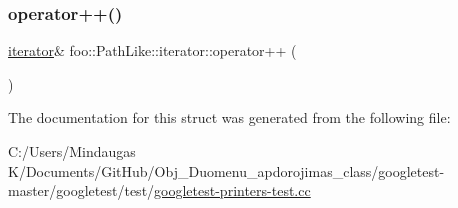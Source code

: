 \subsubsection{\texorpdfstring{operator++()}{operator++()}\hspace{0.1cm}{\footnotesize\ttfamily [2/2]}}
{\footnotesize\ttfamily \mbox{\hyperlink{structfoo_1_1_path_like_1_1iterator}{iterator}}\& foo\+::\+Path\+Like\+::iterator\+::operator++ (\begin{DoxyParamCaption}{ }\end{DoxyParamCaption})}



The documentation for this struct was generated from the following file\+:\begin{DoxyCompactItemize}
\item 
C\+:/\+Users/\+Mindaugas K/\+Documents/\+Git\+Hub/\+Obj\+\_\+\+Duomenu\+\_\+apdorojimas\+\_\+class/googletest-\/master/googletest/test/\mbox{\hyperlink{googletest-master_2googletest_2test_2googletest-printers-test_8cc}{googletest-\/printers-\/test.\+cc}}\end{DoxyCompactItemize}

